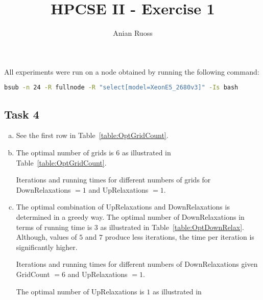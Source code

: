 \documentclass[11pt]{article}
\begin{document}
    \title{HPCSE II - Exercise 1}
    \author{Anian Ruoss}
    \maketitle

    All experiments were run on a node obtained by running the following
    command:
    \begin{lstlisting}[language=bash, basicstyle=\footnotesize]
bsub -n 24 -R fullnode -R "select[model=XeonE5_2680v3]" -Is bash
    \end{lstlisting}

    \subsection*{Task 4}
    \label{subsec:Task4}
    \begin{enumerate}[a)]
        \item See the first row in Table~\ref{table:OptGridCount}.
        \item The optimal number of grids is $6$ as illustrated
        in Table~\ref{table:OptGridCount}.
        \begin{table}[H]
            \caption{Iterations and running times for different numbers of
            grids for DownRelaxations $=1$ and UpRelaxations $=1$.}
            \begin{center}
                
            \end{center}
            \label{table:OptGridCount}
        \end{table}
        \item The optimal combination of UpRelaxations and DownRelaxations is
        determined in a greedy way.
        The optimal number of DownRelaxations in terms of running time is $3$
        as illustrated in Table~\ref{table:OptDownRelax}.
        Although, values of $5$ and $7$ produce less iterations, the time per
        iteration is significantly higher.
        \begin{table}[H]
            \caption{Iterations and running times for different numbers of
            DownRelaxations given GridCount $= 6$ and UpRelaxations $= 1$.}
            \begin{center}
                
            \end{center}
            \label{table:OptDownRelax}
        \end{table}
        The optimal number of UpRelaxations is $1$ as illustrated in

\end{enumerate}
\end{document}
